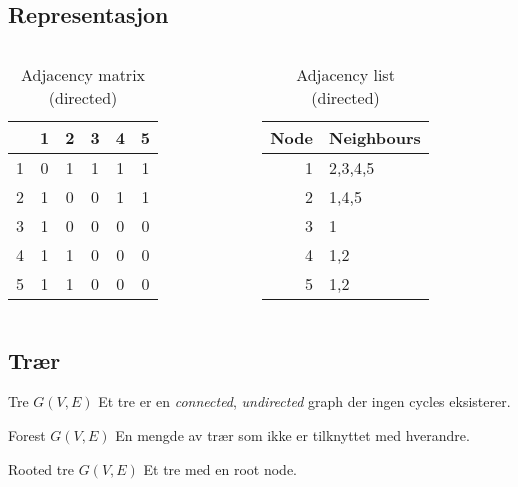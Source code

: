 \subsection*{Representasjon}
\begin{frame}
\begin{center}
\end{center}
\vspace{-1cm}
\begin{columns}
    \begin{column}{0.48\textwidth}
 \begin{table}[]
\centering
\label{tab:adjmatexample}
\begin{tabular}{r|ccccc}
  & 1 & 2 & 3 & 4 & 5 \\ \hline
1 & 0  & 1  & 1  &  1 & 1  \\
2 & 1  & 0  & 0  &  1 & 1  \\
3 & 1  & 0  & 0  &  0 & 0  \\
4 & 1  & 1  & 0  & 0  & 0  \\
5 & 1  & 1  & 0  & 0  & 0 
\end{tabular}
\caption{Adjacency matrix (directed)}
\end{table}
 \end{column}
    \begin{column}{0.48\textwidth}
\begin{table}[]
\centering
\label{tab:adjlistexample}
\begin{tabular}{r|l}
Node & Neighbours \\ \hline
1   &  {2,3,4,5}          \\
2   &  {1,4,5}          \\
3   &  {1}          \\
4   &  {1,2}          \\
5   &  {1,2}         
\end{tabular}
\caption{Adjacency list (directed)}
\end{table}
 \end{column}
\end{columns}
\end{frame}

\subsection{Trær}
\begin{frame}
\begin{block}{Tre $G(V,E)$}
    Et tre er en \textit{connected}, \textit{undirected} graph der ingen cycles eksisterer.
    \end{block}
\begin{block}{Forest $G(V,E)$}
    En mengde av trær som ikke er tilknyttet med hverandre.
    \end{block}
\begin{block}{Rooted tre $G(V,E)$}
    Et tre med en root node.
    \end{block}
\end{frame}

